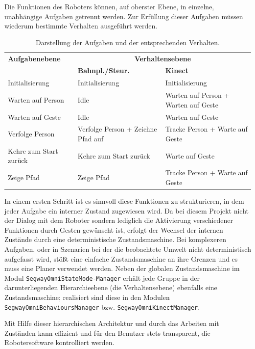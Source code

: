 Die Funktionen des Roboters können, auf oberster Ebene, in einzelne, unabhängige Aufgaben getrennt werden. Zur Erfüllung dieser Aufgaben müssen wiederum bestimmte Verhalten ausgeführt werden.
\begin{table}[h]
	\label{tab:integration_aufgaben}
	\centering
	\begin{tabular}{|p{3.7cm}|p{3cm}|p{3.2cm}|}
	\hline
	\textbf{Aufgabenebene}	&	\multicolumn{2}{c|}{\textbf{Verhaltensebene}}\\
		&	\textbf{Bahnpl./Steur.}	&	\textbf{Kinect}	\\
	\hline
	Initialisierung	&	Initialisierung	&	Initialisierung \\
	\hline
	Warten auf Person	&	Idle	&	Warten auf Person + Warten auf Geste \\
	\hline
	Warten auf Geste	&	Idle	&	Warten auf Geste \\
	\hline
	Verfolge Person	&	Verfolge Person + Zeichne Pfad auf	&	Tracke Person + Warte auf Geste \\
	\hline
	Kehre zum Start zurück	&	Kehre zum Start zurück	&	Warte auf Geste \\
	\hline
	Zeige Pfad	& Zeige Pfad	&	Tracke Person + Warte auf Geste \\
	\hline
	\end{tabular}
	\caption{Darstellung der Aufgaben und der entsprechenden Verhalten.}
\end{table}
In einem ersten Schritt ist es sinnvoll diese Funktionen zu strukturieren, in dem jeder Aufgabe ein 
interner Zustand zugewiesen wird. Da bei diesem Projekt nicht der Dialog mit dem Roboter sondern lediglich 
die Aktivierung verschiedener Funktionen durch Gesten gewünscht ist, erfolgt der Wechsel der internen 
Zustände durch eine deterministische Zustandsmaschine. Bei komplexeren 
Aufgaben, oder in Szenarien bei der die beobachtete Umwelt nicht deterministisch aufgefasst wird, stößt 
eine einfache Zustandsmaschine an ihre Grenzen und es muss eine Planer verwendet werden.
Neben der globalen Zustandsmaschine im Modul
\lstinline{SegwayOmniStateMode-Manager} erhält jede Gruppe in der darunterliegenden Hierarchieebene (die Verhaltensebene) ebenfalls eine Zustandsmaschine; 
realisiert sind diese in den Modulen \lstinline{SegwayOmniBehavioursManager} bzw. \lstinline{SegwayOmniKinectManager}.

Mit Hilfe dieser hierarchischen Architektur und durch das Arbeiten mit Zuständen kann effizient und für 
den Benutzer stets transparent, die Robotersoftware kontrolliert werden.

